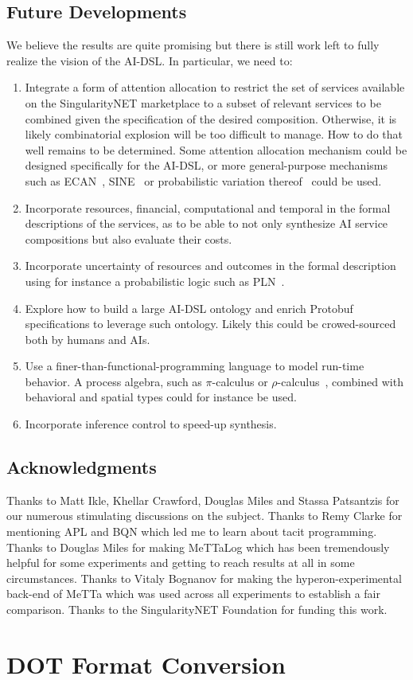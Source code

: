 \documentclass[]{report}
\begin{document}
\section{Future Developments}
We believe the results are quite promising but there is still work
left to fully realize the vision of the AI-DSL.  In particular, we
need to:
\begin{enumerate}
\item Integrate a form of attention allocation to restrict the set of
  services available on the SingularityNET marketplace to a subset of
  relevant services to be combined given the specification of the
  desired composition.  Otherwise, it is likely combinatorial
  explosion will be too difficult to manage.  How to do that well
  remains to be determined.  Some attention allocation mechanism could
  be designed specifically for the AI-DSL, or more general-purpose
  mechanisms such as ECAN~\cite{Pitt2009}, SINE~\cite{Hoder2011} or
  probabilistic variation thereof~\cite{Agnieszka2019} could be used.
\item Incorporate resources, financial, computational and temporal in
  the formal descriptions of the services, as to be able to not only
  synthesize AI service compositions but also evaluate their costs.
\item Incorporate uncertainty of resources and outcomes in the formal
  description using for instance a probabilistic logic such as
  PLN~\cite{Goertzel09PLN}.
\item Explore how to build a large AI-DSL ontology and enrich Protobuf
  specifications to leverage such ontology.  Likely this could be
  crowed-sourced both by humans and AIs.
\item Use a finer-than-functional-programming language to model
  run-time behavior.  A process algebra, such as $\pi$-calculus or
  $\rho$-calculus~\cite{Meredith2005}, combined with behavioral and
  spatial types could for instance be used.
\item Incorporate inference control to speed-up synthesis.
\end{enumerate}

\section{Acknowledgments}
Thanks to Matt Ikle, Khellar Crawford, Douglas Miles and Stassa
Patsantzis for our numerous stimulating discussions on the subject.
Thanks to Remy Clarke for mentioning APL and BQN which led me to learn
about tacit programming.  Thanks to Douglas Miles for making
\mbox{MeTTaLog} which has been tremendously helpful for some
experiments and getting to reach results at all in some circumstances.
Thanks to Vitaly Bognanov for making the hyperon-experimental back-end
of MeTTa which was used across all experiments to establish a fair
comparison.  Thanks to the SingularityNET Foundation for funding this
work.

\appendix
\chapter{DOT Format Conversion}
\label{apdx:dot}

 
\end{document}

